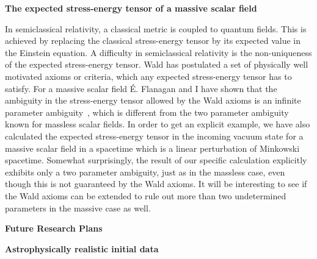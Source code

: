 \documentclass[11pt]{article}
\begin{document}
\begin{spacing}{0.95}
\medskip %
\noindent
{\bf The expected stress-energy tensor of a massive scalar field }
\smallskip

In semiclassical relativity, a classical metric is coupled to quantum
fields. This is achieved by replacing the classical stress-energy tensor by
its expected value in the Einstein equation. A difficulty in semiclassical
relativity is the non-uniqueness of the expected stress-energy tensor. Wald
has postulated a set of physically well motivated axioms or criteria, which
any expected stress-energy tensor has to satisfy.  For a massive scalar
field \'E. Flanagan and I have shown that the ambiguity in the
stress-energy tensor allowed by the Wald axioms is an infinite parameter
ambiguity~\cite{Tichy:1998ws}, which is different from the two parameter
ambiguity known for massless scalar fields. In order to get an explicit
example, we have also calculated the expected stress-energy tensor in the
incoming vacuum state for a massive scalar field in a spacetime which is
a linear perturbation of Minkowski spacetime. Somewhat surprisingly, the
result of our specific calculation explicitly exhibits only a two parameter
ambiguity, just as in the massless case, even though this is not guaranteed
by the Wald axioms. 
It will be interesting to see if the Wald axioms can be
extended to rule out more than two undetermined parameters in the massive
case as well.









\bigskip
\bigskip

\clearpage

\noindent
\centerline{\bf \large Future Research Plans}
\medskip %

\noindent
{\bf Astrophysically realistic initial data}
\smallskip


\end{spacing}
\end{document}
